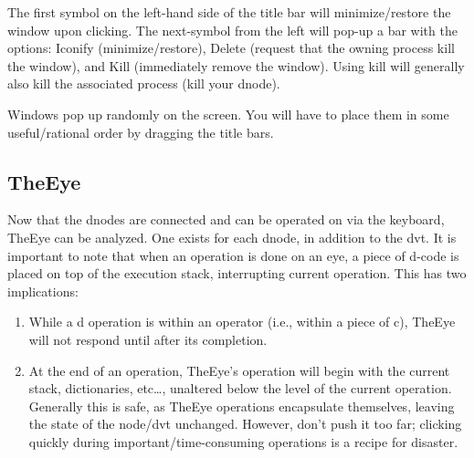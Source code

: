 \documentclass[12pt]{article}
\begin{document}
The first symbol on the left-hand side of the title bar will
minimize/restore the window upon clicking. The next-symbol from the
left will pop-up a bar with the options: Iconify (minimize/restore),
Delete (request that the owning process kill the window), and Kill
(immediately remove the window).  Using kill will generally also kill
the associated process (kill your dnode).

Windows pop up randomly on the screen. You will have to place them in
some useful/rational order by dragging the title bars. 

\subsection{TheEye}
\label{sec:eye}

Now that the dnodes are connected and can be operated on via the
keyboard, TheEye can be analyzed. One exists for each dnode, in
addition to the dvt. It is important to note that when an operation is
done on an eye, a piece of d-code is placed on top of the execution
stack, interrupting current operation. This has two implications:
\begin{enumerate}
  \item While a d operation is within an operator (i.e., within a
  piece of c), TheEye will not respond until after its completion.
  \item At the end of an operation, TheEye's operation will begin with
  the current stack, dictionaries, etc\dots, unaltered below the level
  of the current operation. Generally this is safe, as TheEye
  operations encapsulate themselves, leaving the state of the node/dvt
  unchanged. However, don't push it too far; clicking quickly during
  important/time-consuming operations is a recipe for disaster.
\end{enumerate}
\end{document}
